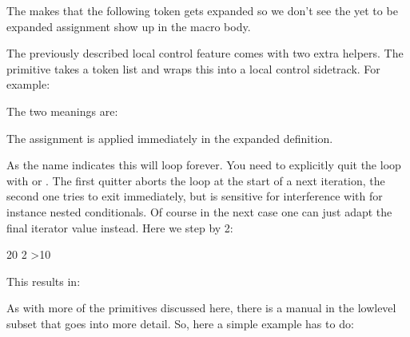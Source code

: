 \start \getbuffer
\starttabulate[|T|T|]
\NC \string\testa \NC \meaning\testa \NC \NR
\NC \string\testc \NC \meaning\testc \NC \NR
\NC \string\testd \NC \meaning\testd \NC \NR
\stoptabulate
\stop

The  makes that the following token gets expanded so we don't
see the yet to be expanded assignment show up in the macro body.

\stopnewprimitive

\startnewprimitive[title={\prm {localcontrolled}}]

The previously described local control feature comes with two extra helpers. The
 primitive takes a token list and wraps this into a local
control sidetrack. For example:

\startbuffer
\edef\testa{\scratchcounter123 \the\scratchcounter}
\edef\testb{\localcontrolled{\scratchcounter123}\the\scratchcounter}
\stopbuffer

\typebuffer

The two meanings are:

\start \getbuffer
\starttabulate[|T|T|]
\NC \string\testa \NC \meaningfull\testa \NC \NR
\NC \string\testb \NC \meaningfull\testb \NC \NR
\stoptabulate
\stop

The assignment is applied immediately in the expanded definition.

\stopnewprimitive

\startnewprimitive[title={\prm {localcontrolledendless}}]

As the name indicates this will loop forever. You need to explicitly quit the
loop with  or . The first quitter aborts the
loop at the start of a next iteration, the second one tries to exit immediately,
but is sensitive for interference with for instance nested conditionals. Of
course in the next case one can just adapt the final iterator value instead. Here
we step by 2:

\startbuffer
{} 20 2 {%
    \ifnum\currentloopiterator>10
        \quitloop
    \else
        [!]
    \fi
}
\stopbuffer

\typebuffer

This results in:

\getbuffer

\stopnewprimitive

\startnewprimitive[title={\prm {localcontrolledloop}}]

As with more of the primitives discussed here, there is a manual in the \quote
{lowlevel} subset that goes into more detail. So, here a simple example has to
do:

